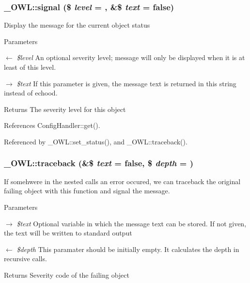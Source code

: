 \subsubsection[{signal}]{\setlength{\rightskip}{0pt plus 5cm}\_\-OWL::signal (\$ {\em level} = {}, \/  \&\$ {\em text} = {\ttfamily false})}\label{class__OWL_a51ba4a16409acf2a2f61f286939091a5}
Display the message for the current object status


\begin{DoxyParams}{Parameters}
\item[\mbox{$\leftarrow$} {\em \$level}]An optional severity level; message will only be displayed when it is at least of this level. \item[\mbox{$\rightarrow$} {\em \$text}]If this parameter is given, the message text is returned in this string instead of echood. \end{DoxyParams}
\begin{DoxyReturn}{Returns}
The severity level for this object 
\end{DoxyReturn}


References ConfigHandler::get().



Referenced by \_\-OWL::set\_\-status(), and \_\-OWL::traceback().

\subsubsection[{traceback}]{\setlength{\rightskip}{0pt plus 5cm}\_\-OWL::traceback (\&\$ {\em text} = {\ttfamily false}, \/  \$ {\em depth} = {})}\label{class__OWL_aa29547995d6741b7d2b90c1d4ea99a13}
If somehwere in the nested calls an error occured, we can traceback the original failing object with this function and signal the message.


\begin{DoxyParams}{Parameters}
\item[\mbox{$\rightarrow$} {\em \$text}]Optional variable in which the message text can be stored. If not given, the text will be written to standard output \item[\mbox{$\leftarrow$} {\em \$depth}]This paramater should be initially empty. It calculates the depth in recursive calls. \end{DoxyParams}
\begin{DoxyReturn}{Returns}
Severity code of the failing object 
\end{DoxyReturn}


